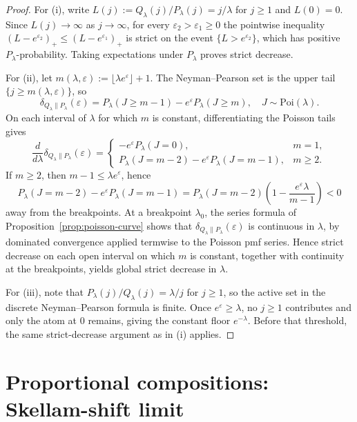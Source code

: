 \documentclass{article}
\begin{document}
\begin{proof}
For (i), write $L(j) := Q_\lambda(j)/P_\lambda(j) = j/\lambda$ for $j \geq 1$ and $L(0) = 0$. Since $L(j) \to \infty$ as
$j \to \infty$, for every $\varepsilon_2 > \varepsilon_1 \geq 0$ the pointwise inequality $(L - e^{\varepsilon_2})_+ \leq (L - e^{\varepsilon_1})_+$ is strict on the event
$\{L > e^{\varepsilon_2}\}$, which has positive $P_\lambda$-probability. Taking expectations under $P_\lambda$ proves strict decrease.

For (ii), let $m(\lambda, \varepsilon) := \lfloor \lambda e^\varepsilon \rfloor + 1$. The Neyman--Pearson set is the upper tail $\{j \geq m(\lambda, \varepsilon)\}$, so
\[
\delta_{Q_\lambda\|P_\lambda}(\varepsilon) = P_\lambda(J \geq m - 1) - e^\varepsilon P_\lambda(J \geq m), \quad J \sim \mathrm{Poi}(\lambda).
\]
On each interval of $\lambda$ for which $m$ is constant, differentiating the Poisson tails gives
\[
\frac{d}{d\lambda}\delta_{Q_\lambda\|P_\lambda}(\varepsilon) = \begin{cases} -e^\varepsilon P_\lambda(J = 0), & m = 1, \\ P_\lambda(J = m-2) - e^\varepsilon P_\lambda(J = m-1), & m \geq 2. \end{cases}
\]
If $m \geq 2$, then $m - 1 \leq \lambda e^\varepsilon$, hence
\[
P_\lambda(J = m-2) - e^\varepsilon P_\lambda(J = m-1) = P_\lambda(J = m-2)\!\left(1 - \frac{e^\varepsilon \lambda}{m-1}\right) < 0
\]
away from the breakpoints. At a breakpoint $\lambda_0$, the series formula of Proposition~\ref{prop:poisson-curve} shows that $\delta_{Q_\lambda\|P_\lambda}(\varepsilon)$ is
continuous in $\lambda$, by dominated convergence applied termwise to the Poisson pmf series. Hence strict decrease on each
open interval on which $m$ is constant, together with continuity at the breakpoints, yields global strict decrease in $\lambda$.

For (iii), note that $P_\lambda(j)/Q_\lambda(j) = \lambda/j$ for $j \geq 1$, so the active set in the discrete Neyman--Pearson
formula is finite. Once $e^\varepsilon \geq \lambda$, no $j \geq 1$ contributes and only the atom at 0 remains, giving the
constant floor $e^{-\lambda}$. Before that threshold, the same strict-decrease argument as in (i) applies.
\end{proof}

\section{Proportional compositions: Skellam-shift limit}
\end{document}
